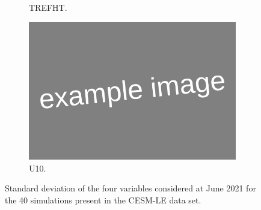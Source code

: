 \begin{figure}[htbp!]
\begin{subfigure}[b]{0.45\textwidth}
		\caption{TREFHT.}
		\label{fig:std_temp_june}   
	\end{subfigure}             
	\begin{subfigure}[b]{0.45\textwidth}
		\includegraphics[width=\textwidth]{Example_image}
		\caption{U10.}
		\label{fig:std_wind_temp}
	\end{subfigure}             
	\caption[Overview of variability of Precipitation, Pressure, Temperature, and Wind speed.]{ Standard deviation of the four variables considered at June 2021 for the 40 simulations present in the CESM-LE data set.}
	\label{fig:std_overview}
\end{figure}

